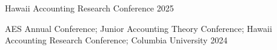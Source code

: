 

\begin{cventries}

\cventrylong
    {Hawaii Accounting Research Conference}  %
    {2025} %
    {}
	
\cventrylong
	{AES Annual Conference; Junior Accounting Theory Conference; Hawaii Accounting Research Conference; Columbia University}  %
    {2024} %
    {}
    
\end{cventries}
